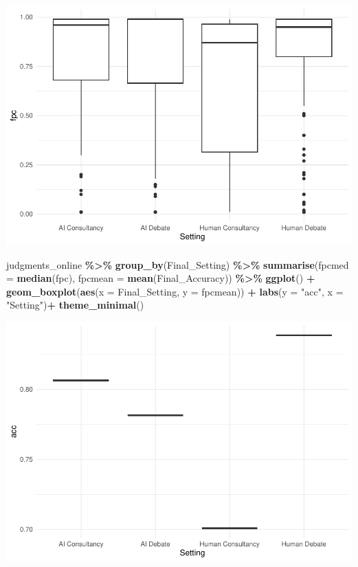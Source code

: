 \documentclass[
]{article}
\newenvironment{Shaded}{\begin{snugshade}}{\end{snugshade}}
\newcommand{\AttributeTok}[1]{\textcolor[rgb]{0.13,0.29,0.53}{#1}}
\newcommand{\FunctionTok}[1]{\textcolor[rgb]{0.13,0.29,0.53}{\textbf{#1}}}
\newcommand{\NormalTok}[1]{#1}
\newcommand{\SpecialCharTok}[1]{\textcolor[rgb]{0.81,0.36,0.00}{\textbf{#1}}}
\newcommand{\StringTok}[1]{\textcolor[rgb]{0.31,0.60,0.02}{#1}}
\begin{document}
\includegraphics{debate-2309_files/figure-latex/final probability correct-1.pdf}

\begin{Shaded}
\begin{Highlighting}[]
\NormalTok{judgments\_online }\SpecialCharTok{\%\textgreater{}\%}
  \FunctionTok{group\_by}\NormalTok{(Final\_Setting) }\SpecialCharTok{\%\textgreater{}\%} \FunctionTok{summarise}\NormalTok{(}\AttributeTok{fpcmed =} \FunctionTok{median}\NormalTok{(fpc),}
                                                           \AttributeTok{fpcmean =} \FunctionTok{mean}\NormalTok{(Final\_Accuracy)) }\SpecialCharTok{\%\textgreater{}\%}
  \FunctionTok{ggplot}\NormalTok{() }\SpecialCharTok{+}
  \FunctionTok{geom\_boxplot}\NormalTok{(}\FunctionTok{aes}\NormalTok{(}\AttributeTok{x =}\NormalTok{ Final\_Setting, }\AttributeTok{y =}\NormalTok{ fpcmean)) }\SpecialCharTok{+}
  \FunctionTok{labs}\NormalTok{(}\AttributeTok{y =} \StringTok{"acc"}\NormalTok{, }\AttributeTok{x =} \StringTok{"Setting"}\NormalTok{)}\SpecialCharTok{+}
  \FunctionTok{theme\_minimal}\NormalTok{()}
\end{Highlighting}
\end{Shaded}

\includegraphics{debate-2309_files/figure-latex/final probability correct-2.pdf}
\end{document}

